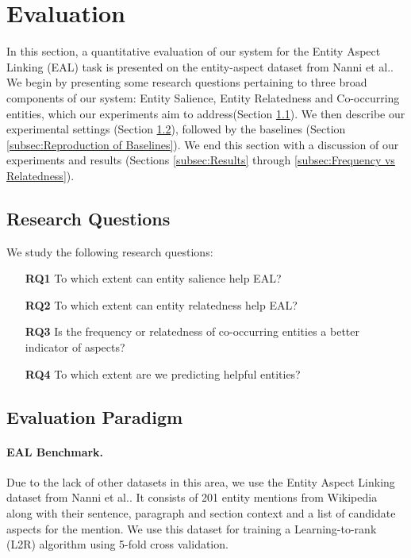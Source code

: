 
\section{Evaluation}
\label{sec:Evaluation}
In this section, a quantitative evaluation of our system for the Entity Aspect Linking (EAL) task is presented on the entity-aspect dataset from Nanni et al.\cite{nanni2018entity}. We begin by presenting some research questions pertaining to three broad components of our system: Entity Salience, Entity Relatedness and Co-occurring entities, which our experiments aim to address(Section \ref{subsec:Research Questions}). We then describe our experimental settings (Section \ref{subsec:Evaluation Paradigm}), followed by the baselines (Section \ref{subsec:Reproduction of Baselines}). We end this section with a discussion of our experiments and results (Sections \ref{subsec:Results} through \ref{subsec:Frequency vs Relatedness}).

\subsection{Research Questions}
\label{subsec:Research Questions}
We study the following research questions:
\begin{itemize}
\item[\textbf{RQ1}] To which extent can  entity salience help EAL?
\item[\textbf{RQ2}] To which extent can entity relatedness help EAL?
\item[\textbf{RQ3}] Is the frequency or relatedness of co-occurring entities a better indicator of aspects? 
\item[\textbf{RQ4}] To which extent are we predicting helpful entities?
\end{itemize}

\subsection{Evaluation Paradigm}
\label{subsec:Evaluation Paradigm}

\paragraph{\textbf{EAL Benchmark.}} Due to the lack of other datasets in this area, we use the Entity Aspect Linking dataset from Nanni et al.\cite{nanni2018entity}. It consists of 201 entity mentions from Wikipedia along with their sentence, paragraph and section context and a list of candidate aspects for the mention.   We use this dataset for training a Learning-to-rank (L2R) algorithm using 5-fold cross validation. 

